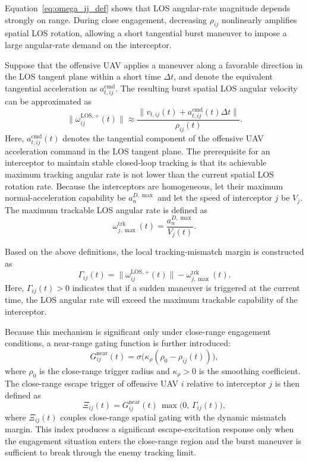 \documentclass{cja}
\begin{document}
Equation~\eqref{eq:omega_ij_def} shows that LOS angular-rate magnitude depends strongly on range. During close engagement, decreasing $\rho_{ij}$ nonlinearly amplifies spatial LOS rotation, allowing a short tangential burst maneuver to impose a large angular-rate demand on the interceptor.

Suppose that the offensive UAV applies a maneuver along a favorable direction in the LOS tangent plane within a short time $\Delta t$, and denote the equivalent tangential acceleration as $a_{t,ij}^{\mathrm{cmd}}$. The resulting burst spatial LOS angular velocity can be approximated as
\begin{equation}
\|\omega_{ij}^{\mathrm{LOS},+}(t)\|
\approx
\frac{\|v_{t,ij}(t)+a_{t,ij}^{\mathrm{cmd}}(t)\Delta t\|}{\rho_{ij}(t)}.
\end{equation}
Here, $a_{t,ij}^{\mathrm{cmd}}(t)$ denotes the tangential component of the offensive UAV acceleration command in the LOS tangent plane.
The prerequisite for an interceptor to maintain stable closed-loop tracking is that its achievable maximum tracking angular rate is not lower than the current spatial LOS rotation rate. Because the interceptors are homogeneous, let their maximum normal-acceleration capability be $a_n^{D,\max}$ and let the speed of interceptor $j$ be $V_j$. The maximum trackable LOS angular rate is defined as
\begin{equation}
\omega_{j,\max}^{\mathrm{trk}}(t)
=
\frac{a_n^{D,\max}}{V_j(t)}.
\end{equation}

Based on the above definitions, the local tracking-mismatch margin is constructed as
\begin{equation}
\Gamma_{ij}(t)
=
\|\omega_{ij}^{\mathrm{LOS},+}(t)\|
-
\omega_{j,\max}^{\mathrm{trk}}(t).
\end{equation}
Here, $\Gamma_{ij}(t)>0$ indicates that if a sudden maneuver is triggered at the current time, the LOS angular rate will exceed the maximum trackable capability of the interceptor.

Because this mechanism is significant only under close-range engagement conditions, a near-range gating function is further introduced:
\begin{equation}
G_{ij}^{\mathrm{near}}(t)
=
\sigma\!\bigl(\kappa_{\rho}(\rho_0-\rho_{ij}(t))\bigr),
\end{equation}
where $\rho_0$ is the close-range trigger radius and $\kappa_{\rho}>0$ is the smoothing coefficient. The close-range escape trigger of offensive UAV $i$ relative to interceptor $j$ is then defined as
\begin{equation}
\Xi_{ij}(t)
=
G_{ij}^{\mathrm{near}}(t)\,\max\bigl(0,\, \Gamma_{ij}(t)\bigr),
\end{equation}
where $\Xi_{ij}(t)$ couples close-range spatial gating with the dynamic mismatch margin. This index produces a significant escape-excitation response only when the engagement situation enters the close-range region and the burst maneuver is sufficient to break through the enemy tracking limit.
\end{document}

